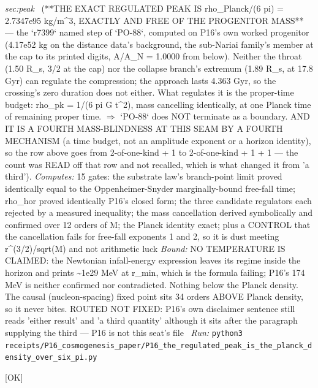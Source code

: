 \begin{description}
\textit{sec:peak} \ (**THE EXACT REGULATED PEAK IS rho\_Planck/(6 pi) = 2.7347e95 kg/m\textasciicircum{}3, EXACTLY AND FREE OF THE PROGENITOR MASS** --- the `r7399` named step of `PO-88`, computed on P16's own worked progenitor (4.17e52 kg on the distance data's background, the sub-Nariai family's member at the cap to its printed digits, A/A\_N = 1.0000 from below). Neither the throat (1.50 R\_s, 3/2 at the cap) nor the collapse branch's extremum (1.89 R\_s, at 17.8 Gyr) can regulate the compression; the approach lasts 4.363 Gyr, so the crossing's zero duration does not either. What regulates it is the proper-time budget: rho\_pk = 1/(6 pi G t\textasciicircum{}2), mass cancelling identically, at one Planck time of remaining proper time. \ensuremath{\Rightarrow} `PO-88` does NOT terminate as a boundary.  AND IT IS A FOURTH MASS-BLINDNESS AT THIS SEAM BY A FOURTH MECHANISM (a time budget, not an amplitude exponent or a horizon identity), so the row above goes from 2-of-one-kind + 1 to 2-of-one-kind + 1 + 1 --- the count was READ off that row and not recalled, which is what changed it from 'a third'). 
\emph{Computes:} 15 gates: the substrate law's branch-point limit proved identically equal to the Oppenheimer-Snyder marginally-bound free-fall time; rho\_hor proved identically P16's closed form; the three candidate regulators each rejected by a measured inequality; the mass cancellation derived symbolically and confirmed over 12 orders of M; the Planck identity exact; plus a CONTROL that the cancellation fails for free-fall exponents 1 and 2, so it is dust meeting r\textasciicircum{}(3/2)/sqrt(M) and not arithmetic luck
 \emph{Bound:}  NO TEMPERATURE IS CLAIMED: the Newtonian infall-energy expression leaves its regime inside the horizon and prints \textasciitilde{}1e29 MeV at r\_min, which is the formula failing; P16's 174 MeV is neither confirmed nor contradicted. Nothing below the Planck density. The causal (nucleon-spacing) fixed point sits 34 orders ABOVE Planck density, so it never bites.  ROUTED NOT FIXED: P16's own disclaimer sentence still reads 'either result' and 'a third quantity' although it sits after the paragraph supplying the third --- P16 is not this seat's file
\ \emph{Run:} \texttt{python3 receipts/P16\_cosmogenesis\_paper/P16\_the\_regulated\_peak\_is\_the\_planck\_density\_over\_six\_pi.py}
\item[\rcptlabel{P16_the_crossing_is_an_involution_and_the_density_is_even_on_the_unsigned_radius}{P16R5}\textbf{P16R5}\quad\texttt{P16\_the\_crossing\_is\_an\_involution\_and\_the\_density\_is\_even\_on\_the\_unsigned\_radius}]\hfill\textsf{[OK]}\\

\end{description}
